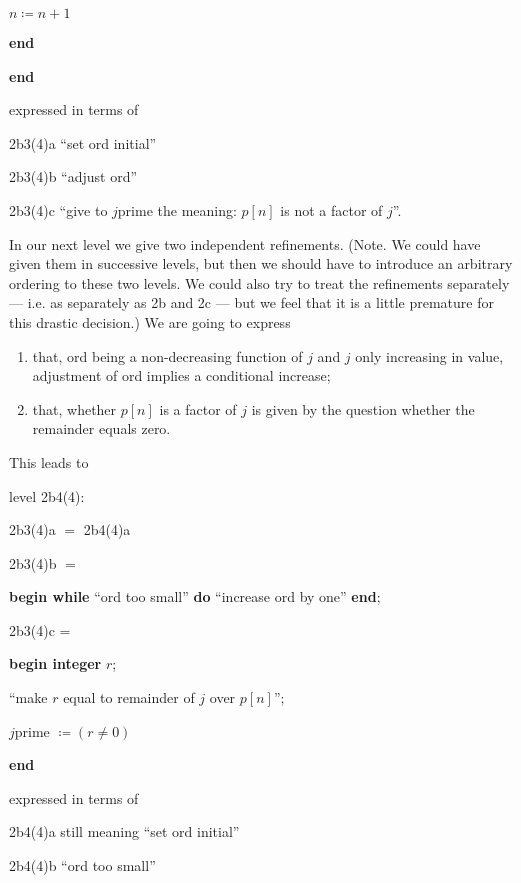 \noindent
\quad\quad\quad $n \coloneq n + 1$

\noindent
\quad\textbf{end}

\noindent
\textbf{end}

\noindent
expressed in terms of

\noindent
2b3(4)a\tabto{5em} ``set ord initial''

\noindent
2b3(4)b\tabto{5em} ``adjust ord''

\noindent
2b3(4)c\tabto{5em} ``give to $j$prime the meaning: $p[n]$ is not a factor of $j$''. 

In our next level we give two independent refinements. (Note. We could have given them in successive levels, but then we should have to introduce an arbitrary ordering to these two levels. We could also try to treat the refinements separately --- i.e. as separately as 2b and 2c --- but we feel that it is a little premature for this drastic decision.) We are going to express

\begin{enumerate}[leftmargin=2\parindent, label=(\arabic*)]
	\item that, ord being a non-decreasing function of $j$ and $j$ only increasing in value, adjustment of ord implies a conditional increase;

	\item that, whether $p[n]$ is a factor of $j$ is given by the question whether the remainder equals zero.
\end{enumerate}

\noindent
This leads to

\noindent
level 2b4(4):

\noindent
2b3(4)a $=$ 2b4(4)a

\noindent
2b3(4)b $=$

\noindent
\textbf{begin while} ``ord too small'' \textbf{do} ``increase ord by one'' \textbf{end};

\noindent
2b3(4)c =

\noindent
\textbf{begin integer} $r$;

\noindent
\quad ``make $r$ equal to remainder of $j$ over $p[n]$'';

\noindent
\quad $j$prime $\coloneq (r \neq 0)$

\noindent
\textbf{end}

\noindent
expressed in terms of

\noindent
2b4(4)a\tabto{5em} still meaning ``set ord initial''

\noindent
2b4(4)b\tabto{5em} ``ord too small''


